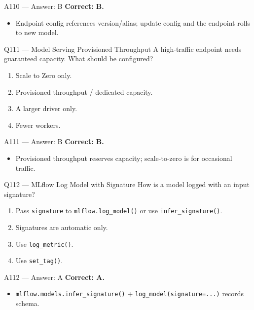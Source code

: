 \documentclass[aspectratio=169,9pt]{beamer}
\begin{document}
	\begin{frame}{A110 --- Answer: B}
		\textbf{Correct: B.}
		\begin{itemize}
			\item Endpoint config references version/alias; update config and the endpoint rolls to new model.
		\end{itemize}
	\end{frame}
	
	\begin{frame}{Q111 --- Model Serving Provisioned Throughput}
		A high-traffic endpoint needs guaranteed capacity. What should be configured?
		\begin{enumerate}[label=\Alph*.]
			\item Scale to Zero only.
			\item Provisioned throughput / dedicated capacity.
			\item A larger driver only.
			\item Fewer workers.
		\end{enumerate}
	\end{frame}
	
	\begin{frame}{A111 --- Answer: B}
		\textbf{Correct: B.}
		\begin{itemize}
			\item Provisioned throughput reserves capacity; scale-to-zero is for occasional traffic.
		\end{itemize}
	\end{frame}
	
	\begin{frame}{Q112 --- MLflow Log Model with Signature}
		How is a model logged with an input signature?
		\begin{enumerate}[label=\Alph*.]
			\item Pass \texttt{signature} to \texttt{mlflow.log\_model()} or use \texttt{infer\_signature()}.
			\item Signatures are automatic only.
			\item Use \texttt{log\_metric()}.
			\item Use \texttt{set\_tag()}.
		\end{enumerate}
	\end{frame}
	
	\begin{frame}{A112 --- Answer: A}
		\textbf{Correct: A.}
		\begin{itemize}
			\item \texttt{mlflow.models.infer\_signature()} + \texttt{log\_model(signature=...)} records schema.
		\end{itemize}
	\end{frame}
	
\end{document}
